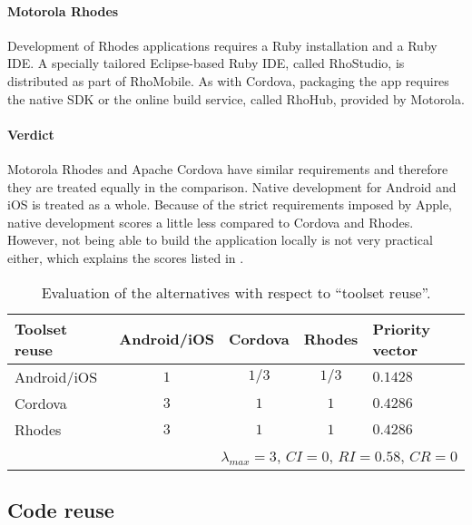 \paragraph{Motorola Rhodes} Development of Rhodes applications requires a Ruby installation and a Ruby IDE. A specially tailored Eclipse-based Ruby IDE, called RhoStudio, is distributed as part of RhoMobile. As with Cordova, packaging the app requires the native SDK or the online build service, called RhoHub, provided by Motorola.

\paragraph{Verdict} Motorola Rhodes and Apache Cordova have similar requirements and therefore they are treated equally in the comparison. 
Native development for Android and iOS is treated as a whole. Because of the strict requirements imposed by Apple, native development scores a little less compared to Cordova and Rhodes. However, not being able to build the application locally is not very practical either, which explains the scores listed in .

\begin{table}[h!]
    \begin{center}
        \begin{tabular}{lcccl}
            \hline
            \textbf{Toolset reuse} & Android/iOS & Cordova & Rhodes & Priority vector \\
            \hline
            Android/iOS            & $1$         & $1/3$   & $1/3$  & $0.1428$        \\
            Cordova                & $3$         & $1$     & $1$    & $0.4286$        \\
            Rhodes                 & $3$         & $1$     & $1$    & $0.4286$        \\
            \hline
            \multicolumn{5}{r}{$\lambda_{max} = 3$, $CI = 0$, $RI = 0.58$, $CR = 0$}  \\
            \hline
        \end{tabular}
        \caption{Evaluation of the alternatives with respect to ``toolset reuse''.}
        \label{tab:tr}
    \end{center}
\end{table}

\subsection{Code reuse}

